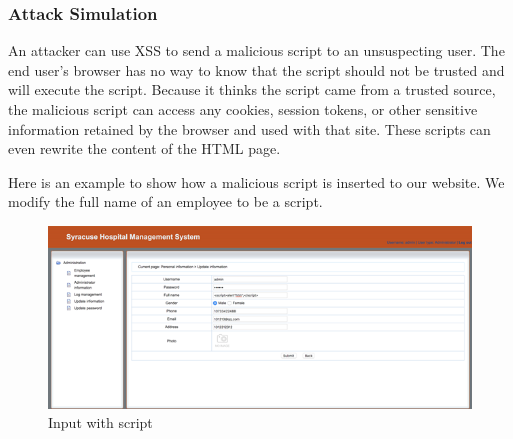 \subsubsection{Attack Simulation}
An attacker can use XSS to send a malicious script to an unsuspecting user. The end user’s browser has no way to know that the script should not be trusted and will execute the script. Because it thinks the script came from a trusted source, the malicious script can access any cookies, session tokens, or other sensitive information retained by the browser and used with that site. These scripts can even rewrite the content of the HTML page. 

Here is an example to show how a malicious script is inserted to our website. We modify the full name of an employee to be a script. 
\begin{figure}[H]
    \centering
    \includegraphics[width=\textwidth]{sp/sp11.png}
    \caption{Input with script}
    \label{fig:s11}
\end{figure}
 
